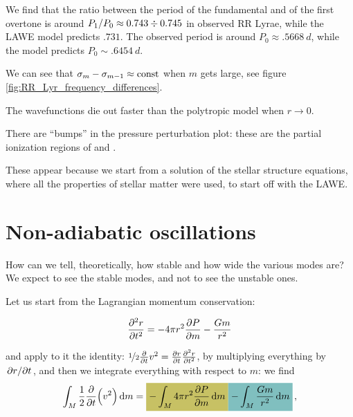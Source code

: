 \documentclass[main.tex]{subfiles}
\begin{document}
We find that the ratio between the period of the fundamental and of the first overtone is around \(P_1 / P_0 \approx \num{.743} \divisionsymbol \num{.745}\) in observed RR Lyrae, while the LAWE model predicts \(\num{.731}\). 
The observed period is around \(P_0 \approx \SI{.5668}{d}\), while the model predicts \(P_0 \sim \SI{.6454}{d}\). 

We can see that \(\sigma_m - \sigma_{m-1} \approx \text{const}\) when \(m\) gets large, see figure \ref{fig:RR_Lyr_frequency_differences}.
  

The wavefunctions die out faster than the polytropic model when \(r \rightarrow 0\).

There are ``bumps'' in the pressure perturbation plot: these are the partial ionization regions of  and .

These appear because we start from a solution of the stellar structure equations, where all the properties of stellar matter were used, to start off with the LAWE.

\section{Non-adiabatic oscillations}

How can we tell, theoretically, how stable and how wide the various modes are?
We expect to see the stable modes, and not to see the unstable ones.

Let us start from the Lagrangian momentum conservation:

\begin{equation}
    \pdv[2]{r}{t} = - 4 \pi r^2 \pdv{P}{m} - \frac{Gm}{r^2}
\end{equation}

and apply to it the identity: \(\frac[i]{1}{2} \pdv{}{t} v^2 = \pdv{r}{t} \pdv[2]{r}{t}\), by multiplying everything by \(\pdv*{r}{t} \), and then we integrate everything with respect to \(m\): we find 
%
\begin{align}
\int_{M} \frac{1}{2} \pdv{}{t} \qty(v^2) \dd{m} = 
\hlc{olive}{- \int_{M} 4 \pi r^2 \pdv{P}{m} \dd{m} }
\hlc{teal}{- \int_{M} \frac{Gm}{r^2} \dd{m}}
\,,
\end{align}
%
\end{document}
